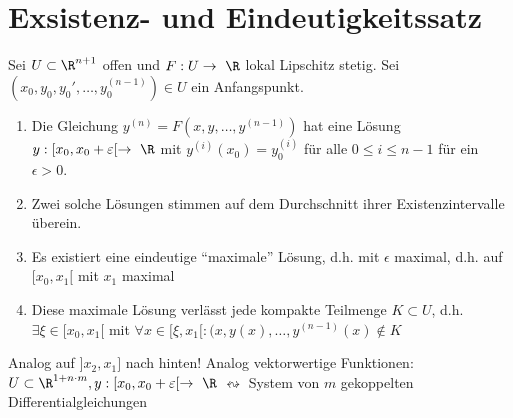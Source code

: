 \section{Exsistenz- und Eindeutigkeitssatz}
\begin{satz*}[note = Exsistenz- und Eindeutigkeitssatz , index = Differentialgleichung Exsistenz und Eindeutigkeits satz , indexformat = {1!2-34.5 5!2-34-~}]
	Sei $U \subset \R^{n+1}$ offen und $F: U \rightarrow \R$ lokal Lipschitz stetig. Sei $( x_0 , y_0 , y_0' , \dotsc , y_0^{(n-1)} ) \in U$ ein Anfangspunkt.
	\begin{enumerate}[label=(\alph*)]
		\item Die Gleichung $y^{(n)} = F( x , y , \dotsc , y^{(n-1)} )$ hat eine Lösung $y : [x_0 , x_0 + \epsilon [ \rightarrow \R$ mit $y^{(i)}(x_0) = y_0^{(i)}$ für alle $0 \leq i \leq n-1$ für ein $\epsilon > 0$.
		\item Zwei solche Lösungen stimmen auf dem Durchschnitt ihrer Existenzintervalle überein.
		\item Es existiert eine eindeutige \enquote{maximale} Lösung, d.h. mit $\epsilon$ maximal, d.h. auf $[ x_0 , x_1 [$ mit $x_1$ maximal
		\item Diese maximale Lösung verlässt jede kompakte Teilmenge $K \subset U$, d.h. $\exists \xi \in [ x_0 , x_1 [$ mit $\forall x \in [ \xi , x_1 [ : ( x , y(x) , \dotsc , y^{(n-1)}(x) \notin K$
	\end{enumerate}
	Analog auf $] x_2 , x_1 ]$ nach hinten!
	Analog vektorwertige Funktionen: $U \subset \R^{1+n \cdot m} , y: [x_0 , x_0+\epsilon [ \rightarrow \R$ $\leftrightsquigarrow$ System von $m$ gekoppelten Differentialgleichungen
\end{satz*}
